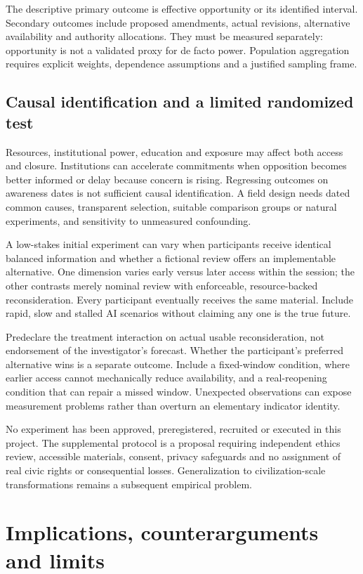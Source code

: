 \documentclass[11pt,a4paper]{article}
\theoremstyle{definition}\newtheorem{definition}{Definition}
\begin{document}
The descriptive primary outcome is effective opportunity or its identified interval. Secondary outcomes include proposed amendments, actual revisions, alternative availability and authority allocations. They must be measured separately: opportunity is not a validated proxy for de facto power. Population aggregation requires explicit weights, dependence assumptions and a justified sampling frame.

\subsection{Causal identification and a limited randomized test}
Resources, institutional power, education and exposure may affect both access and closure. Institutions can accelerate commitments when opposition becomes better informed or delay because concern is rising. Regressing outcomes on awareness dates is not sufficient causal identification. A field design needs dated common causes, transparent selection, suitable comparison groups or natural experiments, and sensitivity to unmeasured confounding.

A low-stakes initial experiment can vary when participants receive identical balanced information and whether a fictional review offers an implementable alternative. One dimension varies early versus later access within the session; the other contrasts merely nominal review with enforceable, resource-backed reconsideration. Every participant eventually receives the same material. Include rapid, slow and stalled AI scenarios without claiming any one is the true future.

Predeclare the treatment interaction on actual usable reconsideration, not endorsement of the investigator's forecast. Whether the participant's preferred alternative wins is a separate outcome. Include a fixed-window condition, where earlier access cannot mechanically reduce availability, and a real-reopening condition that can repair a missed window. Unexpected observations can expose measurement problems rather than overturn an elementary indicator identity.

No experiment has been approved, preregistered, recruited or executed in this project. The supplemental protocol is a proposal requiring independent ethics review, accessible materials, consent, privacy safeguards and no assignment of real civic rights or consequential losses. Generalization to civilization-scale transformations remains a subsequent empirical problem.

\section{Implications, counterarguments and limits}
\end{document}
